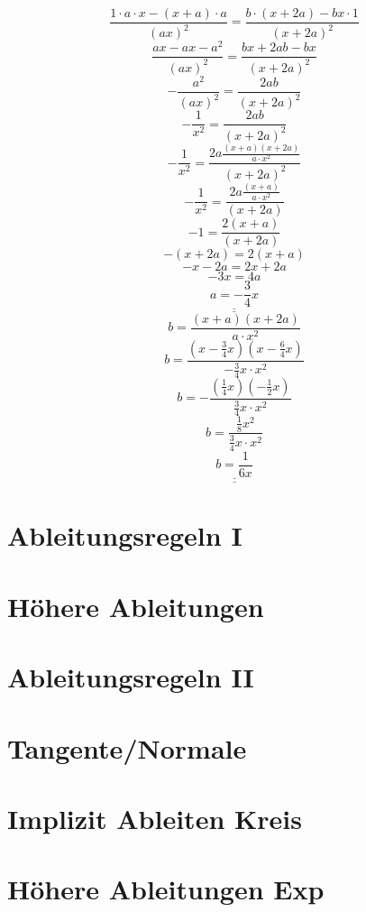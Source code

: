 \[ \frac{1 \cdot a \cdot x - (x + a) \cdot a}{(a x)^2} = \frac{b \cdot (x + 2 a) - b x \cdot 1}{(x + 2 a)^2} \]
\[ \frac{a x - a x - a^2}{(a x)^2} = \frac{b x + 2 a b - b x}{(x + 2 a)^2} \]
\[ -\frac{a^2}{(a x)^2} = \frac{2 a b}{(x + 2 a)^2} \]
\[ -\frac{1}{x^2} = \frac{2 a b}{(x + 2 a)^2} \]
\[ -\frac{1}{x^2} = \frac{2 a \frac{(x + a)(x + 2 a)}{a \cdot x^2}}{(x + 2 a)^2} \]
\[ -\frac{1}{x^2} = \frac{2 a \frac{(x + a)}{a \cdot x^2}}{(x + 2 a)} \]
\[ -1 = \frac{2 (x + a)}{(x + 2 a)} \]
\[ -(x + 2 a) = 2 (x + a) \]
\[ -x - 2 a = 2 x + 2 a \]
\[ -3 x = 4 a \]
\[ \underline{\underline{a = -\frac{3}{4} x}} \]
\[ b = \frac{(x + a)(x + 2 a)}{a \cdot x^2} \]
\[ b = \frac{(x -\frac{3}{4} x)(x - \frac{6}{4} x)}{-\frac{3}{4} x \cdot x^2} \]
\[ b = -\frac{(\frac{1}{4} x)(- \frac{1}{2} x)}{\frac{3}{4} x \cdot x^2} \]
\[ b = \frac{\frac{1}{8} x^2}{\frac{3}{4} x \cdot x^2} \]
\[ \underline{\underline{b = \frac{1}{6 x} }} \]
\[  \]
\[  \]

\section{Ableitungsregeln I}


\section{Höhere Ableitungen}


\section{Ableitungsregeln II}


\section{Tangente/Normale}


\section{Implizit Ableiten Kreis}


\section{Höhere Ableitungen Exp}

